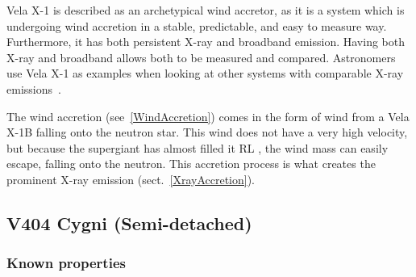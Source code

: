 \documentclass[12pt, a4paper]{article}
\begin{document}
        Vela X-1 is described as an archetypical wind accretor, as it is a system which is undergoing wind accretion in a stable, predictable, and easy to measure way. Furthermore, it has both persistent X-ray  and broadband emission. Having both X-ray and broadband allows both to be measured and compared. Astronomers use Vela X-1 as examples when looking at other systems with comparable X-ray emissions~\parencite{Kretschmar_2021}.
        
        The wind accretion (see~\ref{WindAccretion}) comes in the form of wind from a Vela X-1B falling onto the neutron star. This wind does not have a very high velocity, but because the supergiant has almost filled it RL \parencite{Kretschmar_2021}, the wind mass can easily escape, falling onto the neutron. This accretion process is what creates the prominent X-ray emission (sect.~\ref{XrayAccretion}).

        
    \subsection{V404 Cygni (Semi-detached)} \label{V404Introduction}
        \subsubsection{Known properties}
\end{document}

